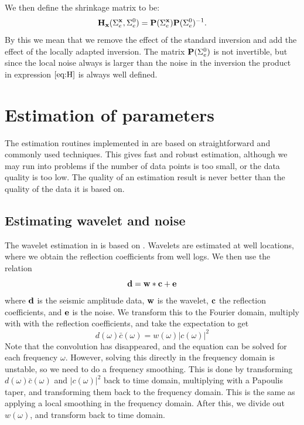We then define the shrinkage matrix to be:
\begin{equation}\label{eq:H}
\mathbf{H_x}(\Sigma_{e}^{\mathbf{x}},\Sigma_{e}^0) = \mathbf{P}(\Sigma_{e}^{\mathbf{x}})\mathbf{P}(\Sigma_{e}^0)^{-1}.
\end{equation}
By this we mean that we remove the effect of the standard inversion and add the effect of
the locally adapted inversion. The matrix $\mathbf{P}(\Sigma_{e}^0)$ is not invertible,
but since the local noise always is larger than the noise in the inversion the product in
expression $\ref{eq:H}$ is always well defined.


\section{Estimation of parameters}
\label{sec:estimateimp}
The estimation routines implemented in \crava are based on straightforward and commonly used techniques. This gives fast and robust estimation, although we may run into problems if the number of data points is too small, or the data quality is too low. The quality of an estimation result is never better than the quality of the data it is based on.
\subsection{Estimating wavelet and noise}
\label{sec:waveestimp}
The wavelet estimation in \crava is based on \cite{White84}. Wavelets are estimated at well locations, where we obtain the reflection coefficients from well logs. We then use the relation
\begin{equation}
\mathbf{d} = \mathbf{w}*\mathbf{c}+\mathbf{e}
\end{equation}
where $\mathbf{d}$ is the seismic amplitude data, $\mathbf{w}$ is the wavelet, $\mathbf{c}$ the reflection coefficients, and $\mathbf{e}$ is the noise. We transform this to the Fourier domain, multiply with with the reflection coefficients, and take the expectation to get
\begin{equation}
d(\omega)\bar{c}(\omega) = w(\omega)|c(\omega)|^2
\end{equation}
Note that the convolution has disappeared, and the equation can be solved for each frequency $\omega$. However, solving this directly in the frequency domain is unstable, so we need to do a frequency smoothing. This is done by transforming $d(\omega)\bar{c}(\omega)$ and $|c(\omega)|^2$ back to time domain, multiplying with a Papoulis taper, and transforming them back to the frequency domain. This is the same as applying a local smoothing in the frequency domain. After this, we divide out $w(\omega)$, and transform back to time domain.

